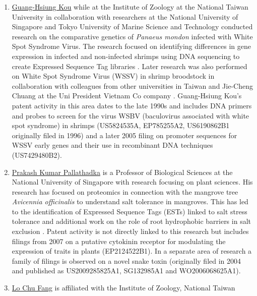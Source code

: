 \documentclass[]{book}
\theoremstyle{definition}
\theoremstyle{definition}
\theoremstyle{definition}
\theoremstyle{remark}
\begin{document}
\begin{enumerate}
\def\labelenumi{\arabic{enumi}.}
\setcounter{enumi}{11}
\item
  \href{https://www.researchgate.net/scientific-contributions/39872049_Guang-Hsiung_Kou}{Guang-Hsiung
  Kou} while at the Institute of Zoology at the National Taiwan
  University in collaboration with researchers at the National
  University of Singapore and Tokyo University of Marine Science and
  Technology conducted research on the comparative genetics of
  \emph{Panaeus mondon} infected with White Spot Syndrome Virus. The
  research focused on identifying differences in gene expression in
  infected and non-infected shrimps using DNA sequencing to create
  Expressed Sequence Tag libraries \citep{Leu_2007}. Later research was
  also performed on White Spot Syndrome Virus (WSSV) in shrimp
  broodstock in collaboration with colleagues from other universities in
  Taiwan and Jie-Cheng Chuang at the Uni President Vietnam Co company
  \citep{Chang_2012}. Guang-Hsiung Kou's patent activity in this area
  dates to the late 1990s and includes DNA primers and probes to screen
  for the virus WSBV (baculovirus associated with white spot syndrome)
  in shrimps (US5824535A, EP785255A2, US6190862B1 originally filed in
  1996) and a later 2005 filing on promoter sequences for WSSV early
  genes and their use in recombinant DNA techniques (US7429480B2).
\item
  \href{https://en.wikipedia.org/wiki/Prakash_Kumar_Pallathadka}{Prakash
  Kumar Pallathadka} is a Professor of Biological Sciences at the
  National University of Singapore with research focusing on plant
  sciences. His research has focused on proteomics in connection with
  the mangrove tree \emph{Avicennia officinalis} to understand salt
  tolerance in mangroves. This has led to the identification of
  Expressed Sequence Tags (ESTs) linked to salt stress tolerance and
  additional work on the role of root hydrophobic barriers in salt
  exclusion
  \citep{Krishnamurthy_2014, Jyothi_Prakash_2014, KRISHNAMURTHY_2014a}.
  Patent activity is not directly linked to this research but includes
  filings from 2007 on a putative cytokinin receptor for modulating the
  expression of traits in plants (EP2124522B1). In a separate area of
  research a family of filings is observed on a novel snake toxin
  (originally filed in 2004 and published as US2009285825A1, SG132985A1
  and WO2006068625A1).
\item
  \href{https://researchoutput.ncku.edu.tw/en/persons/chu-fang-lo}{Lo
  Chu Fang} is affiliated with the Institute of Zoology, National Taiwan

\end{enumerate}
\end{document}
